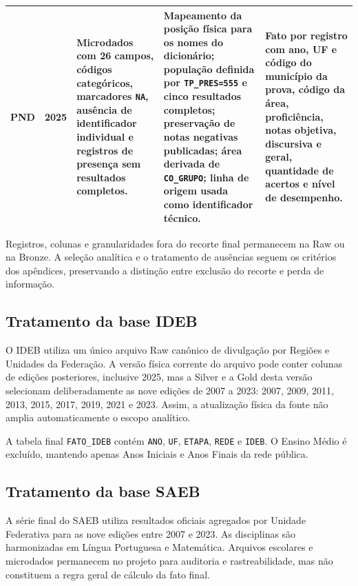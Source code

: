 \begin{landscape}
\begin{table}[H]
\begin{tabular}{|p{2.1cm}|p{2.4cm}|p{6.0cm}|p{6.2cm}|p{5.0cm}|}
PND & 2025 & Microdados com 26 campos, códigos categóricos, marcadores \texttt{NA}, ausência de identificador individual e registros de presença sem resultados completos. & Mapeamento da posição física para os nomes do dicionário; população definida por \texttt{TP\_PRES=555} e cinco resultados completos; preservação de notas negativas publicadas; área derivada de \texttt{CO\_GRUPO}; linha de origem usada como identificador técnico. & Fato por registro com ano, UF e código do município da prova, código da área, proficiência, notas objetiva, discursiva e geral, quantidade de acertos e nível de desempenho. \\ \hline
\end{tabular}
\end{table}
\end{landscape}

Registros, colunas e granularidades fora do recorte final permanecem na Raw ou na Bronze. A seleção analítica e o tratamento de ausências seguem os critérios dos apêndices, preservando a distinção entre exclusão do recorte e perda de informação.

\subsection{Tratamento da base IDEB}

O IDEB utiliza um único arquivo Raw canônico de divulgação por Regiões e Unidades da Federação. A versão física corrente do arquivo pode conter colunas de edições posteriores, inclusive 2025, mas a Silver e a Gold desta versão selecionam deliberadamente as nove edições de 2007 a 2023: 2007, 2009, 2011, 2013, 2015, 2017, 2019, 2021 e 2023. Assim, a atualização física da fonte não amplia automaticamente o escopo analítico.

A tabela final \texttt{FATO\_IDEB} contém \texttt{ANO}, \texttt{UF}, \texttt{ETAPA}, \texttt{REDE} e \texttt{IDEB}. O Ensino Médio é excluído, mantendo apenas Anos Iniciais e Anos Finais da rede pública.

\subsection{Tratamento da base SAEB}

A série final do SAEB utiliza resultados oficiais agregados por Unidade Federativa para as nove edições entre 2007 e 2023. As disciplinas são harmonizadas em Língua Portuguesa e Matemática. Arquivos escolares e microdados permanecem no projeto para auditoria e rastreabilidade, mas não constituem a regra geral de cálculo da fato final.

